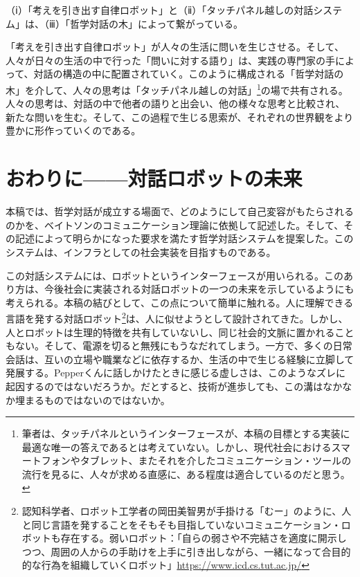 \documentclass[9pt,b5j,twoside,twocolumn]{utarticle}
\begin{document}
（ⅰ）「考えを引き出す自律ロボット」と（ⅱ）「タッチパネル越しの対話システム」は、（ⅲ）「哲学対話の木」によって繋がっている。%

「考えを引き出す自律ロボット」が人々の生活に問いを生じさせる。そして、人々が日々の生活の中で行った「問いに対する語り」は、実践の専門家の手によって、対話の構造の中に配置されていく。このように構成される「哲学対話の木」を介して、人々の思考は「タッチパネル越しの対話」\footnote{筆者は、タッチパネルというインターフェースが、本稿の目標とする実装に最適な唯一の答えであるとは考えていない。しかし、現代社会におけるスマートフォンやタブレット、またそれを介したコミュニケーション・ツールの流行を見るに、人々が求める直感に、ある程度は適合しているのだと思う。}の場で共有される。人々の思考は、対話の中で他者の語りと出会い、他の様々な思考と比較され、新たな問いを生む。そして、この過程で生じる思索が、それぞれの世界観をより豊かに形作っていくのである。




\section{おわりに------対話ロボットの未来}
本稿では、哲学対話が成立する場面で、どのようにして自己変容がもたらされるのかを、ベイトソンのコミュニケーション理論に依拠して記述した。そして、その記述によって明らかになった要求を満たす哲学対話システムを提案した。このシステムは、インフラとしての社会実装を目指すものである。


この対話システムには、ロボットというインターフェースが用いられる。このあり方は、今後社会に実装される対話ロボットの一つの未来を示しているようにも考えられる。本稿の結びとして、この点について簡単に触れる。人に理解できる言語を発する対話ロボット\footnote{認知科学者、ロボット工学者の岡田美智男が手掛ける「むー」のように、人と同じ言語を発することをそもそも目指していないコミュニケーション・ロボットも存在する。弱いロボット：「自らの弱さや不完結さを適度に開示しつつ、周囲の人からの手助けを上手に引き出しながら、一緒になって合目的的な行為を組織していくロボット」\url{https://www.icd.cs.tut.ac.jp/}}は、人に似せようとして設計されてきた。しかし、人とロボットは生理的特徴を共有していないし、同じ社会的文脈に置かれることもない。そして、電源を切ると無残にもうなだれてしまう。一方で、多くの日常会話は、互いの立場や職業などに依存するか、生活の中で生じる経験に立脚して発展する。Pepperくんに話しかけたときに感じる虚しさは、このようなズレに起因するのではないだろうか。だとすると、技術が進歩しても、この溝はなかなか埋まるものではないのではないか。
\end{document}
